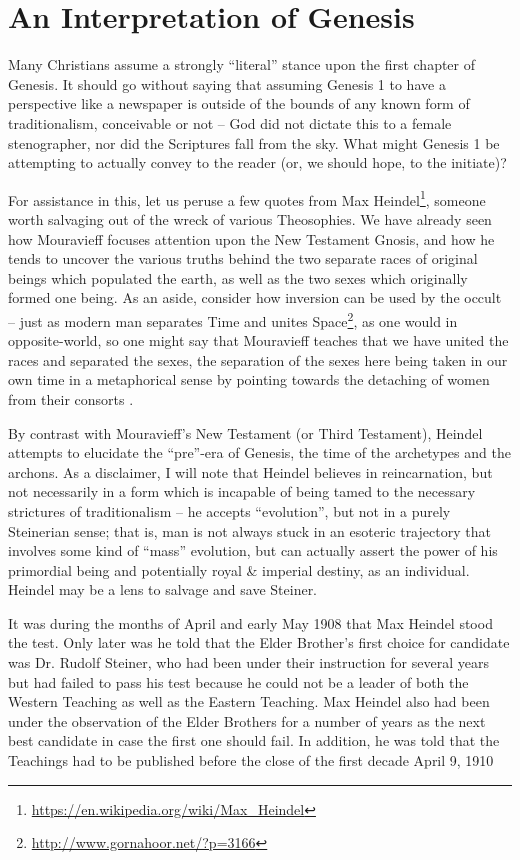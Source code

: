 \section{An Interpretation of Genesis}

Many Christians assume a strongly ``literal'' stance upon the first chapter of Genesis. It should go without saying that assuming Genesis 1 to have a perspective like a newspaper is outside of the bounds of any known form of traditionalism, conceivable or not -- God did not dictate this to a female stenographer, nor did the Scriptures fall from the sky. What might Genesis 1 be attempting to actually convey to the reader (or, we should hope, to the initiate)?

For assistance in this, let us peruse a few quotes from Max Heindel\footnote{\url{https://en.wikipedia.org/wiki/Max\_Heindel}}, someone worth salvaging out of the wreck of various Theosophies. We have already seen how Mouravieff focuses attention upon the New Testament Gnosis, and how he tends to uncover the various truths behind the two separate races of original beings which populated the earth, as well as the two sexes which originally formed one being. As an aside, consider how inversion can be used by the occult -- just as modern man separates Time and unites Space\footnote{\url{http://www.gornahoor.net/?p=3166}}, as one would in opposite-world, so one might say that Mouravieff teaches that we have united the races and separated the sexes, the separation of the sexes here being taken in our own time in a metaphorical sense by pointing towards the detaching of women from their consorts .

By contrast with Mouravieff's New Testament (or Third Testament), Heindel attempts to elucidate the ``pre''-era of Genesis, the time of the archetypes and the archons. As a disclaimer, I will note that Heindel believes in reincarnation, but not necessarily in a form which is incapable of being tamed to the necessary strictures of traditionalism -- he accepts ``evolution'', but not in a purely Steinerian sense; that is, man is not always stuck in an esoteric trajectory that involves some kind of ``mass'' evolution, but can actually assert the power of his primordial being and potentially royal
\& imperial destiny, as an individual. Heindel may be a lens to salvage and save Steiner.

\begin{quotex}
It was during the months of April and early May 1908 that Max Heindel stood the test. Only later was he told that the Elder Brother's first choice for candidate was Dr. Rudolf Steiner, who had been under their instruction for several years but had failed to pass his test because he could not be a leader of both the Western Teaching as well as the Eastern Teaching. Max Heindel also had been under the observation of the Elder Brothers for a number of years as the next best candidate in case the first one should fail. In addition, he was told that the Teachings had to be published before the close of the first decade April 9, 1910 
\end{quotex}


